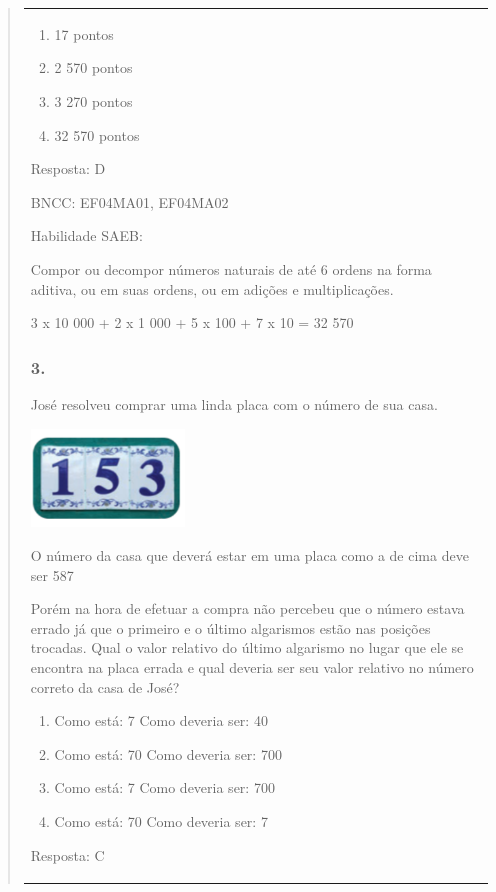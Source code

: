 \begin{enumerate}
\begin{escolha}
\begin{enumerate}
\begin{itemize}
\begin{itemize}
\begin{escolha}
\begin{quote}
\begin{escolha}
{\begin{longtable}[]{@{}l@{}}
\begin{itemize}
\begin{enumerate}
\def\labelenumi{\alph{enumi})}
\item
  17 pontos
\item
  2 570 pontos
\item
  3 270 pontos
\item
  32 570 pontos
\end{enumerate}

Resposta: D

BNCC: EF04MA01, EF04MA02

Habilidade SAEB:

Compor ou decompor números naturais de até 6 ordens na forma aditiva, ou
em suas ordens, ou em adições e multiplicações.

3 x 10 000 + 2 x 1 000 + 5 x 100 + 7 x 10 = 32 570

\subsubsection{3.}\label{section-145}

José resolveu comprar uma linda placa com o número de sua casa.

\includegraphics[width=1.60256in,height=1.03072in]{media/image143.png}

O número da casa que deverá estar em uma placa como a de cima deve ser
587

Porém na hora de efetuar a compra não percebeu que o número estava
errado já que o primeiro e o último algarismos estão nas posições
trocadas. Qual o valor relativo do último algarismo no lugar que ele se
encontra na placa errada e qual deveria ser seu valor relativo no número
correto da casa de José?

\begin{enumerate}
\def\labelenumi{\alph{enumi})}
\item
  Como está: 7 Como deveria ser: 40
\item
  Como está: 70 Como deveria ser: 700
\item
  Como está: 7 Como deveria ser: 700
\item
  Como está: 70 Como deveria ser: 7
\end{enumerate}

Resposta: C


\end{itemize}
\end{longtable}}
\end{escolha}
\end{quote}
\end{escolha}
\end{itemize}
\end{itemize}
\end{enumerate}
\end{escolha}
\end{enumerate}
